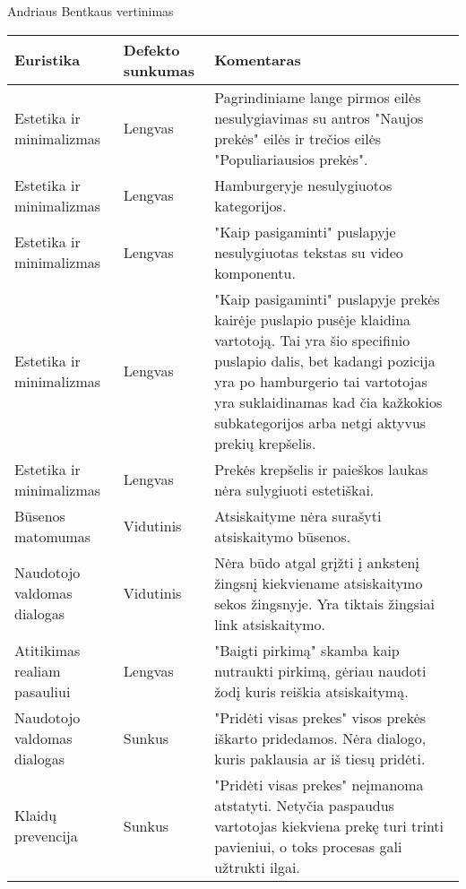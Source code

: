 \documentclass[oneside]{VUMIFPSkursinis}
\begin{document}
Andriaus Bentkaus vertinimas
\begin{center}
	\begin{tabular}{ |p{3cm}| p{3cm} | p{11cm} | }
		\hline
		Euristika                    & Defekto sunkumas & Komentaras \\ \hline
		Estetika ir minimalizmas     & Lengvas          &
			Pagrindiniame lange pirmos eilės nesulygiavimas su antros "Naujos prekės" eilės ir trečios eilės "Populiariausios prekės".
			\\ \hline
		Estetika ir minimalizmas     & Lengvas          &
			Hamburgeryje nesulygiuotos kategorijos.
			\\ \hline
		Estetika ir minimalizmas     & Lengvas          &
			"Kaip pasigaminti" puslapyje nesulygiuotas tekstas su video komponentu.
			\\ \hline
		Estetika ir minimalizmas     & Lengvas          &
			"Kaip pasigaminti" puslapyje prekės kairėje puslapio pusėje klaidina vartotoją.
			Tai yra šio specifinio puslapio dalis, bet kadangi pozicija yra po hamburgerio tai vartotojas yra suklaidinamas kad čia kažkokios subkategorijos arba netgi aktyvus prekių krepšelis.
			\\ \hline
		Estetika ir minimalizmas     & Lengvas          &
			Prekės krepšelis ir paieškos laukas nėra sulygiuoti estetiškai.
			\\ \hline
		Būsenos matomumas            & Vidutinis        &
			Atsiskaityme nėra surašyti atsiskaitymo būsenos.
			\\ \hline
		Naudotojo valdomas dialogas  & Vidutinis         &
			Nėra būdo atgal grįžti į ankstenį žingsnį kiekviename atsiskaitymo sekos žingsnyje.
			Yra tiktais žingsiai link atsiskaitymo.
			\\ \hline
		Atitikimas realiam pasauliui & Lengvas          &
			"Baigti pirkimą" skamba kaip nutraukti pirkimą, gėriau naudoti žodį kuris reiškia atsiskaitymą.
			\\ \hline
		Naudotojo valdomas dialogas  & Sunkus           &
			"Pridėti visas prekes" visos prekės iškarto pridedamos.
			Nėra dialogo, kuris paklausia ar iš tiesų pridėti.
			\\ \hline
		Klaidų prevencija            & Sunkus           &
			"Pridėti visas prekes" neįmanoma atstatyti.
			Netyčia paspaudus vartotojas kiekviena prekę turi trinti pavieniui, o toks procesas gali užtrukti ilgai.
			\\ \hline
	\end{tabular}
\end{center}
\end{document}
